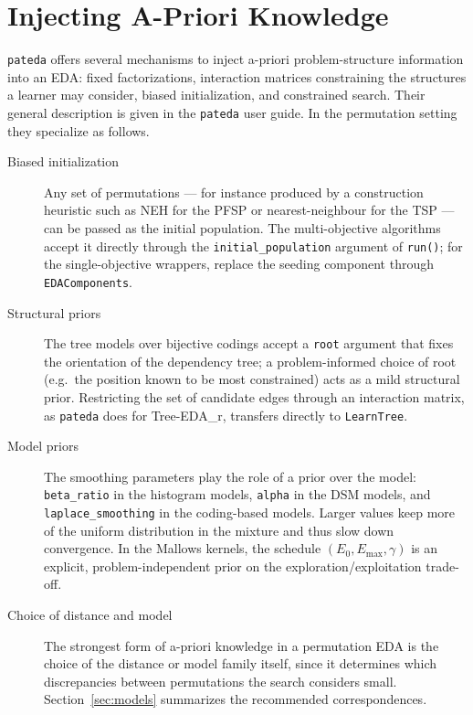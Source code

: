 \documentclass[a4paper,11pt]{article}
\begin{document}
\section{Injecting A-Priori Knowledge}
\label{sec:apriori}

\texttt{pateda} offers several mechanisms to inject a-priori problem-structure
information into an EDA: fixed factorizations, interaction matrices constraining
the structures a learner may consider, biased initialization, and constrained
search.  Their general description is given in the \texttt{pateda} user guide.
In the permutation setting they specialize as follows.

\begin{description}
  \item[Biased initialization] Any set of permutations --- for instance produced
    by a construction heuristic such as NEH for the PFSP or nearest-neighbour for
    the TSP --- can be passed as the initial population.  The multi-objective
    algorithms accept it directly through the \texttt{initial\_population}
    argument of \texttt{run()}; for the single-objective wrappers, replace the
    seeding component through \texttt{EDAComponents}.
  \item[Structural priors] The tree models over bijective codings accept a
    \texttt{root} argument that fixes the orientation of the dependency tree; a
    problem-informed choice of root (e.g.\ the position known to be most
    constrained) acts as a mild structural prior.  Restricting the set of
    candidate edges through an interaction matrix, as \texttt{pateda} does for
    Tree-EDA\_r, transfers directly to \texttt{LearnTree}.
  \item[Model priors] The smoothing parameters play the role of a prior over the
    model: \texttt{beta\_ratio} in the histogram models, \texttt{alpha} in the
    DSM models, and \texttt{laplace\_smoothing} in the coding-based models.
    Larger values keep more of the uniform distribution in the mixture and thus
    slow down convergence.  In the Mallows kernels, the schedule
    $(E_0, E_{\max}, \gamma)$ is an explicit, problem-independent prior on the
    exploration/exploitation trade-off.
  \item[Choice of distance and model] The strongest form of a-priori knowledge in
    a permutation EDA is the choice of the distance or model family itself, since
    it determines which discrepancies between permutations the search considers
    small.  Section~\ref{sec:models} summarizes the recommended correspondences.
\end{description}
\end{document}

